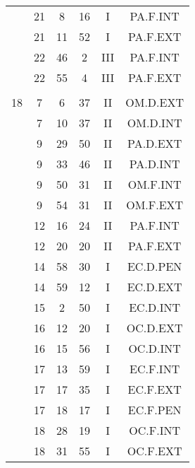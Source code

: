 \documentclass[12pt, a4paper]{article}
\begin{document}
\begin{multicols}{3}
{\begin{tabular}{c c c c c c}
	 	 	 	 & 21 & 8 & 16 & I & PA.F.INT\\%
	 	 	 	 & 21 & 11 & 52 & I & PA.F.EXT\\%
	 	 	 	 & 22 & 46 & 2 & III & PA.F.INT\\%
	 	 	 	 & 22 & 55 & 4 & III & PA.F.EXT\\%
	 	 	 	 & & & & & \\%
	 	 	 	18 & 7 & 6 & 37 & II & OM.D.EXT\\%
	 	 	 	 & 7 & 10 & 37 & II & OM.D.INT\\%
	 	 	 	 & 9 & 29 & 50 & II & PA.D.EXT\\%
	 	 	 	 & 9 & 33 & 46 & II & PA.D.INT\\%
	 	 	 	 & 9 & 50 & 31 & II & OM.F.INT\\%
	 	 	 	 & 9 & 54 & 31 & II & OM.F.EXT\\%
	 	 	 	 & 12 & 16 & 24 & II & PA.F.INT\\%
	 	 	 	 & 12 & 20 & 20 & II & PA.F.EXT\\%
	 	 	 	 & 14 & 58 & 30 & I & EC.D.PEN\\%
	 	 	 	 & 14 & 59 & 12 & I & EC.D.EXT\\%
	 	 	 	 & 15 & 2 & 50 & I & EC.D.INT\\%
	 	 	 	 & 16 & 12 & 20 & I & OC.D.EXT\\%
	 	 	 	 & 16 & 15 & 56 & I & OC.D.INT\\%
	 	 	 	 & 17 & 13 & 59 & I & EC.F.INT\\%
	 	 	 	 & 17 & 17 & 35 & I & EC.F.EXT\\%
	 	 	 	 & 17 & 18 & 17 & I & EC.F.PEN\\%
	 	 	 	 & 18 & 28 & 19 & I & OC.F.INT\\%
	 	 	 	 & 18 & 31 & 55 & I & OC.F.EXT\\%

\end{tabular}}
\end{multicols}
\end{document}
